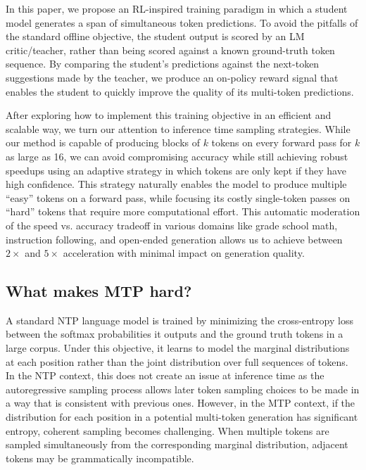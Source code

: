 \documentclass{article}
\theoremstyle{plain}
\theoremstyle{definition}
\theoremstyle{remark}
\begin{document}
In this paper, we propose an RL-inspired training paradigm in which a student model generates a span of simultaneous token predictions. To avoid the pitfalls of the standard offline objective, the student output is scored by an LM critic/teacher, rather than being scored against a known ground-truth token sequence. By comparing the student's predictions against the next-token suggestions made by the teacher, we produce an on-policy reward signal that enables the student to quickly improve the quality of its multi-token predictions.

After exploring how to implement this training objective in an efficient and scalable way, we turn our attention to inference time sampling strategies.  While our method is capable of producing blocks of $k$ tokens on every forward pass for $k$ as large as 16, 
we can avoid compromising accuracy while still achieving robust speedups
using an adaptive strategy in which tokens are only kept if they have high confidence. 
This strategy naturally enables the model to produce multiple ``easy'' tokens on a forward pass, while focusing its costly single-token passes on ``hard'' tokens that require more computational effort.  This automatic moderation of the speed vs. accuracy tradeoff in various domains like grade school math, instruction following, and open-ended generation allows us to achieve between $2\times$ and $5\times$ acceleration with minimal impact on generation quality.


\subsection{What makes MTP hard?}

A standard NTP language model is trained by minimizing the cross-entropy loss between the softmax probabilities it outputs and the ground truth tokens in a large corpus. 
Under this objective, it learns to model the marginal distributions at each position rather than the joint distribution over full sequences of tokens.
In the NTP context, this does not create an issue at inference time as the autoregressive sampling process allows later token sampling choices to be made in a way that is consistent with previous ones. 
However, in the MTP context, if the distribution for each position in a potential multi-token generation has significant entropy, coherent sampling becomes challenging.  
When multiple tokens are sampled simultaneously from the corresponding marginal distribution, adjacent tokens may be grammatically incompatible.
\end{document}
